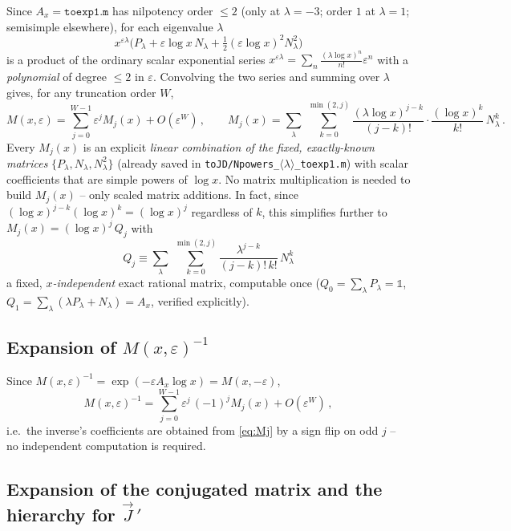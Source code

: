 \documentclass[11pt]{article}
\newcommand{\eps}{\varepsilon}
\newcommand{\Ax}{A_x}
\newcommand{\Jreg}{\vec J\,'}
\begin{document}
Since $A_x=\texttt{toexp1.m}$ has nilpotency order $\le 2$ (only at $\lambda=-3$; order $1$ at
$\lambda=1$; semisimple elsewhere), for each eigenvalue $\lambda$
\begin{equation}
x^{\eps\lambda}\Big(P_\lambda + \eps\log x\, N_\lambda + \tfrac{1}{2}(\eps\log x)^2 N_\lambda^2\Big)
\end{equation}
is a product of the ordinary scalar exponential series $x^{\eps\lambda}=\sum_n \frac{(\lambda\log
x)^n}{n!}\eps^n$ with a \emph{polynomial} of degree $\le2$ in $\eps$. Convolving the two series and
summing over $\lambda$ gives, for any truncation order $W$,
\begin{equation}
M(x,\eps) = \sum_{j=0}^{W-1} \eps^j M_j(x) + O(\eps^W)\,, \qquad
M_j(x) = \sum_\lambda\ \sum_{k=0}^{\min(2,j)} \frac{(\lambda\log x)^{j-k}}{(j-k)!}\cdot
\frac{(\log x)^k}{k!}\,N_\lambda^k\,.
\label{eq:Mj}
\end{equation}
Every $M_j(x)$ is an explicit \emph{linear combination of the fixed, exactly-known matrices}
$\{P_\lambda, N_\lambda, N_\lambda^2\}$ (already saved in \texttt{toJD/Npowers\_$\langle\lambda\rangle$\_toexp1.m})
with scalar coefficients that are simple powers of $\log x$. No matrix multiplication is needed to
build $M_j(x)$ -- only scaled matrix additions. In fact, since $(\log x)^{j-k}(\log x)^k=(\log x)^j$
regardless of $k$, this simplifies further to $M_j(x) = (\log x)^j\, Q_j$ with
\begin{equation}
Q_j \equiv \sum_\lambda\ \sum_{k=0}^{\min(2,j)} \frac{\lambda^{j-k}}{(j-k)!\,k!}\,N_\lambda^k
\end{equation}
a fixed, \emph{$x$-independent} exact rational matrix, computable once ($Q_0=\sum_\lambda P_\lambda
= \mathbb 1$, $Q_1 = \sum_\lambda(\lambda P_\lambda + N_\lambda)=\Ax$, verified explicitly).

\subsection{Expansion of $M(x,\eps)^{-1}$}

Since $M(x,\eps)^{-1}=\exp(-\eps A_x\log x)=M(x,-\eps)$,
\begin{equation}
M(x,\eps)^{-1} = \sum_{j=0}^{W-1}\eps^j\,(-1)^j M_j(x) + O(\eps^W)\,,
\end{equation}
i.e.\ the inverse's coefficients are obtained from \eqref{eq:Mj} by a sign flip on odd $j$ -- no
independent computation is required.

\subsection{Expansion of the conjugated matrix and the hierarchy for $\Jreg$}
\end{document}
